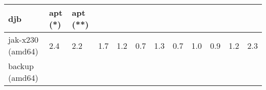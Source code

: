 \documentclass[parskip=half]{scrartcl}
\begin{document}
\begin{table}[h]
\begin{tabular}{@{}llllllllllll@{}}
\begin{minipage}[b]{0.05\columnwidth}
djb\strut
\end{minipage} & \begin{minipage}[b]{0.05\columnwidth}\raggedright\strut
apt (*)\strut
\end{minipage} & \begin{minipage}[b]{0.05\columnwidth}\raggedright\strut
apt (**)\strut
\end{minipage}\tabularnewline
\midrule
\begin{minipage}[t]{0.12\columnwidth}\raggedright\strut
jak-x230 (amd64)\strut
\end{minipage} & \begin{minipage}[t]{0.05\columnwidth}\raggedright\strut
2.4\strut
\end{minipage} & \begin{minipage}[t]{0.05\columnwidth}\raggedright\strut
2.2\strut
\end{minipage} & \begin{minipage}[t]{0.05\columnwidth}\raggedright\strut
1.7\strut
\end{minipage} & \begin{minipage}[t]{0.05\columnwidth}\raggedright\strut
1.2\strut
\end{minipage} & \begin{minipage}[t]{0.05\columnwidth}\raggedright\strut
0.7\strut
\end{minipage} & \begin{minipage}[t]{0.05\columnwidth}\raggedright\strut
1.3\strut
\end{minipage} & \begin{minipage}[t]{0.05\columnwidth}\raggedright\strut
0.7\strut
\end{minipage} & \begin{minipage}[t]{0.05\columnwidth}\raggedright\strut
1.0\strut
\end{minipage} & \begin{minipage}[t]{0.05\columnwidth}\raggedright\strut
0.9\strut
\end{minipage} & \begin{minipage}[t]{0.05\columnwidth}\raggedright\strut
1.2\strut
\end{minipage} & \begin{minipage}[t]{0.05\columnwidth}\raggedright\strut
2.3\strut
\end{minipage}\tabularnewline
\begin{minipage}[t]{0.12\columnwidth}\raggedright\strut
backup (amd64)\strut
\end{minipage} & \begin{minipage}[t]{0.05\columnwidth}\raggedright\strut

\end{minipage}
\end{tabular}
\end{table}
\end{document}
